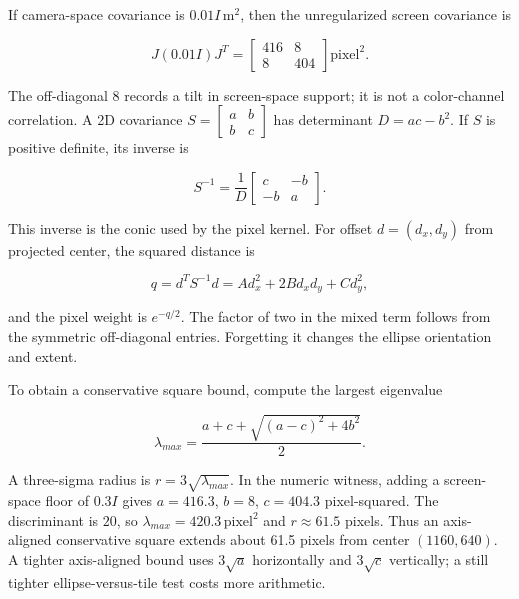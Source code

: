 If camera-space covariance is \(0.01I\,\mathrm{m}^2\), then the unregularized screen covariance is

\[
J(0.01I)J^T=\begin{bmatrix}416&8\\8&404\end{bmatrix}\mathrm{pixel}^2.
\]

The off-diagonal \(8\) records a tilt in screen-space support; it is not a color-channel correlation. A 2D covariance \(S=\begin{bmatrix}a&b\\b&c\end{bmatrix}\) has determinant \(D=ac-b^2\). If \(S\) is positive definite, its inverse is

\[
S^{-1}=\frac1D\begin{bmatrix}c&-b\\-b&a\end{bmatrix}.
\]

This inverse is the conic used by the pixel kernel. For offset \(d=(d_x,d_y)\) from projected center, the squared distance is

\[
q=d^TS^{-1}d=A d_x^2+2B d_xd_y+C d_y^2,
\]

and the pixel weight is \(e^{-q/2}\). The factor of two in the mixed term follows from the symmetric off-diagonal entries. Forgetting it changes the ellipse orientation and extent.

To obtain a conservative square bound, compute the largest eigenvalue

\[
\lambda_{max}=\frac{a+c+\sqrt{(a-c)^2+4b^2}}2.
\]

A three-sigma radius is \(r=3\sqrt{\lambda_{max}}\). In the numeric witness, adding a screen-space floor of \(0.3I\) gives \(a=416.3\), \(b=8\), \(c=404.3\) pixel-squared. The discriminant is \(20\), so \(\lambda_{max}=420.3\,\mathrm{pixel}^2\) and \(r\approx61.5\) pixels. Thus an axis-aligned conservative square extends about 61.5 pixels from center \((1160,640)\). A tighter axis-aligned bound uses \(3\sqrt a\) horizontally and \(3\sqrt c\) vertically; a still tighter ellipse-versus-tile test costs more arithmetic.

